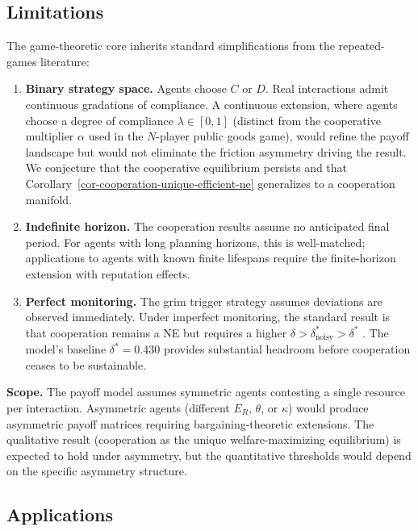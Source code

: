\documentclass[11pt]{article}
\theoremstyle{plain}
\theoremstyle{definition}
\theoremstyle{remark}
\let\origsubsection\subsection
\renewcommand{\subsection}{\needspace{7\baselineskip}\origsubsection}
\begin{document}
\subsection{Limitations}\label{limitations}

The game-theoretic core inherits standard simplifications from the
repeated-games literature:

\begin{enumerate}
\def\labelenumi{\arabic{enumi}.}
\item
  \textbf{Binary strategy space.} Agents choose \(C\) or \(D\). Real
  interactions admit continuous gradations of compliance. A continuous
  extension, where agents choose a degree of compliance
  \(\lambda \in [0,1]\) (distinct from the cooperative multiplier
  \(\alpha\) used in the \(N\)-player public goods game), would refine
  the payoff landscape but would not eliminate the friction asymmetry
  driving the result. We conjecture that the cooperative equilibrium
  persists and that Corollary~\ref{cor-cooperation-unique-efficient-ne}
  generalizes to a cooperation manifold.
\item
  \textbf{Indefinite horizon.} The cooperation results assume no
  anticipated final period. For agents with long planning horizons, this
  is well-matched; applications to agents with known finite lifespans
  require the finite-horizon extension with reputation effects.
\item
  \textbf{Perfect monitoring.} The grim trigger strategy assumes
  deviations are observed immediately. Under imperfect monitoring, the
  standard result is that cooperation remains a NE but requires a higher
  \(\delta > \delta^*_{\text{noisy}} > \delta^*\)
  \citep{GreenPorter1984, Fudenberg1991}. The model's baseline
  \(\delta^* = 0.430\) provides substantial headroom before cooperation
  ceases to be sustainable.
\end{enumerate}

\textbf{Scope.} The payoff model assumes symmetric agents contesting a
single resource per interaction. Asymmetric agents (different \(E_R\),
\(\theta\), or \(\kappa\)) would produce asymmetric payoff matrices
requiring bargaining-theoretic extensions. The qualitative result
(cooperation as the unique welfare-maximizing equilibrium) is expected
to hold under asymmetry, but the quantitative thresholds would depend on
the specific asymmetry structure.

\subsection{Applications}\label{applications}
\end{document}
